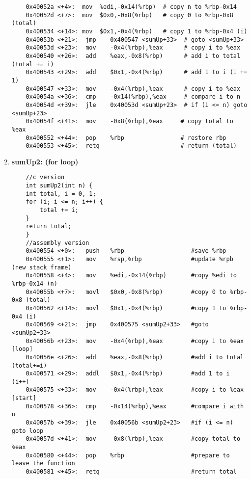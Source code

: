 \documentclass{article}
\begin{document}
\begin{enumerate}
\begin{verbatim}
    0x40052a <+4>:  mov  %edi,-0x14(%rbp)  # copy n to %rbp-0x14
    0x40052d <+7>:  mov  $0x0,-0x8(%rbp)   # copy 0 to %rbp-0x8 (total)
    0x400534 <+14>: mov  $0x1,-0x4(%rbp)   # copy 1 to %rbp-0x4 (i)
    0x40053b <+21>:  jmp    0x400547 <sumUp+33>  # goto <sumUp+33>
    0x40053d <+23>:  mov    -0x4(%rbp),%eax      # copy i to %eax
    0x400540 <+26>:  add    %eax,-0x8(%rbp)      # add i to total (total += i)
    0x400543 <+29>:  add    $0x1,-0x4(%rbp)      # add 1 to i (i += 1)
    0x400547 <+33>:  mov    -0x4(%rbp),%eax      # copy i to %eax
    0x40054a <+36>:  cmp    -0x14(%rbp),%eax     # compare i to n
    0x40054d <+39>:  jle    0x40053d <sumUp+23>  # if (i <= n) goto <sumUp+23>
    0x40054f <+41>:  mov    -0x8(%rbp),%eax     # copy total to %eax
    0x400552 <+44>:  pop    %rbp                # restore rbp
    0x400553 <+45>:  retq                       # return (total)
    \end{verbatim}
    \item \textbf{sumUp2: (for loop)}
    \begin{verbatim}
    //c version
    int sumUp2(int n) {
    int total, i = 0, 1;
    for (i; i <= n; i++) {
        total += i;
    }
    return total;
    }
    //assembly version
    0x400554 <+0>:   push   %rbp                   #save %rbp
    0x400555 <+1>:   mov    %rsp,%rbp              #update %rpb (new stack frame)
    0x400558 <+4>:   mov    %edi,-0x14(%rbp)       #copy %edi to %rbp-0x14 (n)
    0x40055b <+7>:   movl   $0x0,-0x8(%rbp)        #copy 0 to %rbp-0x8 (total)
    0x400562 <+14>:  movl   $0x1,-0x4(%rbp)        #copy 1 to %rbp-0x4 (i)
    0x400569 <+21>:  jmp    0x400575 <sumUp2+33>   #goto <sumUp2+33>
    0x40056b <+23>:  mov    -0x4(%rbp),%eax        #copy i to %eax [loop]
    0x40056e <+26>:  add    %eax,-0x8(%rbp)        #add i to total (total+=i)
    0x400571 <+29>:  addl   $0x1,-0x4(%rbp)        #add 1 to i (i++)
    0x400575 <+33>:  mov    -0x4(%rbp),%eax        #copy i to %eax [start]
    0x400578 <+36>:  cmp    -0x14(%rbp),%eax       #compare i with n
    0x40057b <+39>:  jle    0x40056b <sumUp2+23>   #if (i <= n) goto loop
    0x40057d <+41>:  mov    -0x8(%rbp),%eax        #copy total to %eax
    0x400580 <+44>:  pop    %rbp                   #prepare to leave the function
    0x400581 <+45>:  retq                          #return total
    \end{verbatim}
\end{enumerate}
\end{document}
